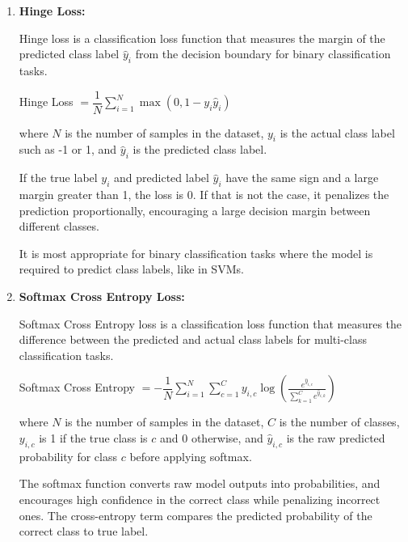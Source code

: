 \documentclass[12pt,letterpaper, onecolumn]{exam}
\begin{document}
\begin{questions}
\begin{parts}
\begin{solution}
\begin{enumerate}[label=(\alph*)]
                \item \textbf{Hinge Loss:}
                
                Hinge loss is a classification loss function that measures the margin of the predicted class label $\hat{y}_i$ from the decision boundary for binary classification tasks.
                
                \begin{center}
                    Hinge Loss $\displaystyle{= \dfrac{1}{N} \sum_{i=1}^{N} \max(0, 1 - y_i \hat{y}_i)}$
                \end{center}

                where $N$ is the number of samples in the dataset, $y_i$ is the actual class label such as -1 or 1, and $\hat{y}_i$ is the predicted class label.

                If the true label $y_i$ and predicted label $\hat{y}_i$ have the same sign and a large margin greater than 1, the loss is 0.
                If that is not the case, it penalizes the prediction proportionally, encouraging a large decision margin between different classes.

                It is most appropriate for binary classification tasks where the model is required to predict class labels, like in SVMs.
                
                \item \textbf{Softmax Cross Entropy Loss:}
                
                Softmax Cross Entropy loss is a classification loss function that measures the difference between the predicted and actual class labels for multi-class classification
                tasks.

                \begin{center}
                    Softmax Cross Entropy $\displaystyle{= -\dfrac{1}{N} \sum_{i=1}^{N} \sum_{c=1}^{C} y_{i,c} \log(\frac{e^{\hat{y}_{i,c}}}{\sum_{k=1}^{C}{e^{\hat{y}_{i,k}}}})}$
                \end{center}

                where $N$ is the number of samples in the dataset, $C$ is the number of classes, $y_{i,c}$ is 1 if the true class is $c$ and 0 otherwise, and $\hat{y}_{i,c}$ is the raw predicted probability for class $c$
                before applying softmax.

                The softmax function converts raw model outputs into probabilities, and encourages high confidence in the correct class while penalizing incorrect ones.
                The cross-entropy term compares the predicted probability of the correct class to true label.


\end{enumerate}
\end{solution}
\end{parts}
\end{questions}
\end{document}

